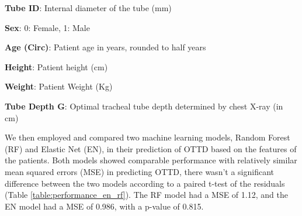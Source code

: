 \documentclass[11pt]{article}
\begin{document}
\begin{table}[h]
\caption{Descriptive statistics of variables}
\label{table:descriptive}
\begin{threeparttable}
\renewcommand{\TPTminimum}{\linewidth}
\begin{tablenotes}
\footnotesize
\item \textbf{Tube ID}: Internal diameter of the tube (mm)
\item \textbf{Sex}: 0: Female, 1: Male
\item \textbf{Age (Circ)}: Patient age in years, rounded to half years
\item \textbf{Height}: Patient height (cm)
\item \textbf{Weight}: Patient Weight (Kg)
\item \textbf{Tube Depth G}: Optimal tracheal tube depth determined by chest X-ray (in cm)
\end{tablenotes}
\end{threeparttable}
\end{table}


We then employed and compared two machine learning models, Random Forest (RF) and Elastic Net (EN), in their prediction of OTTD based on the features of the patients. Both models showed comparable performance with relatively similar mean squared errors (MSE) in predicting OTTD, there wasn't a significant difference between the two models according to a paired t-test of the residuals (Table \ref{table:performance_en_rf}). The RF model had a MSE of 1.12, and the EN model had a MSE of 0.986, with a p-value of 0.815.
\end{document}
